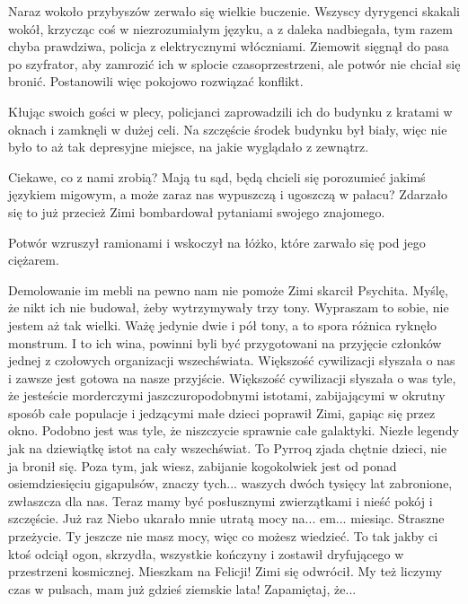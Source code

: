 Naraz wokoło przybyszów zerwało się wielkie buczenie.
Wszyscy dyrygenci skakali wokół, krzycząc coś w niezrozumiałym języku, a z daleka nadbiegała, tym razem chyba prawdziwa, policja z elektrycznymi włóczniami.
Ziemowit sięgnął do pasa po szyfrator, aby zamrozić ich w splocie czasoprzestrzeni, ale potwór nie chciał się bronić.
Postanowili więc pokojowo rozwiązać konflikt.

Kłując swoich gości w plecy, policjanci zaprowadzili ich do budynku z kratami w oknach i zamknęli w dużej celi.
Na szczęście środek budynku był biały, więc nie było to aż tak depresyjne miejsce, na jakie wyglądało z zewnątrz.

\begin{dialogue}
\ds{} Ciekawe, co z nami zrobią? Mają tu sąd, będą chcieli się porozumieć jakimś językiem migowym, a może zaraz nas wypuszczą i ugoszczą w pałacu? Zdarzało się to już przecież
\dm{} Zimi bombardował pytaniami swojego znajomego.
\end{dialogue}

Potwór wzruszył ramionami i wskoczył na łóżko, które zarwało się pod jego ciężarem.

\begin{dialogue}
\ds{} Demolowanie im mebli na pewno nam nie pomoże \dm{} Zimi skarcił Psychita. \dm{} Myślę, że nikt ich nie budował, żeby wytrzymywały trzy tony.
\ds{} Wypraszam to sobie, nie jestem aż tak wielki. Ważę jedynie dwie i pół tony, a to spora różnica \dm{} ryknęło monstrum. \dm{}
I to ich wina, powinni byli być przygotowani na przyjęcie członków jednej z czołowych organizacji wszechświata. 
Większość cywilizacji słyszała o nas i zawsze jest gotowa na nasze przyjście.
\ds{} Większość cywilizacji słyszała o was tyle, że jesteście morderczymi jaszczuropodobnymi istotami, zabijającymi w okrutny sposób całe populacje i jedzącymi małe dzieci \dm{}
poprawił Zimi, gapiąc się przez okno. \dm{} Podobno jest was tyle, że niszczycie sprawnie całe galaktyki. Niezłe legendy jak na dziewiątkę istot na cały wszechświat.
\ds{} To Pyrroq zjada chętnie dzieci, nie ja \dm{} bronił się. \dm{} Poza tym, jak wiesz, zabijanie kogokolwiek jest od ponad osiemdziesięciu gigapulsów, 
znaczy tych... waszych dwóch tysięcy lat zabronione, zwłaszcza dla nas.
Teraz mamy być posłusznymi zwierzątkami i nieść pokój i szczęście. Już raz Niebo ukarało mnie utratą mocy na... em... miesiąc. Straszne przeżycie.
Ty jeszcze nie masz mocy, więc co możesz wiedzieć. To tak jakby ci ktoś odciął ogon, skrzydła, wszystkie kończyny i zostawił dryfującego w przestrzeni kosmicznej.
\ds{} Mieszkam na Felicji! \dm{} Zimi się odwrócił. \dm{} My też liczymy czas w pulsach, mam już gdzieś ziemskie lata! Zapamiętaj, że...
\end{dialogue}

